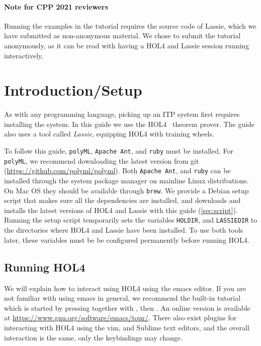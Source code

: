
\paragraph{Note for CPP 2021 reviewers}
Running the examples in the tutorial requires the source code of Lassie, which
we have submitted as non-anonymous material. We chose to submit the tutorial
anonymously, as it can be read with having a HOL4 and Lassie session running
interactively.

\section{Introduction/Setup}
%
As with any programming language, picking up an ITP system first requires
installing the system.
In this guide we use the HOL4~\cite{HOL4web} theorem prover.
The guide also uses a tool called \emph{Lassie}, equipping HOL4 with training
wheels.

To follow this guide, \texttt{polyML}, \texttt{Apache Ant}, and \texttt{ruby}
must be installed.
For \texttt{polyML}, we recommend downloading the latest version from git
(\url{https://github.com/polyml/polyml}).
Both \texttt{Apache Ant}, and \texttt{ruby} can be installed through the system
package manager on mainline Linux distributions.
On Mac OS they should be available through \texttt{brew}.
We provide a Debian setup script that makes sure all the dependencies are
installed,
and downloads and installs the latest versions of HOL4 and Lassie with this
guide (\autoref{sec:script}).
Running the setup script temporarily sets the variables \texttt{HOLDIR}, and
\texttt{LASSIEDIR} to the directories where HOL4 and Lassie have been installed.
To use both tools later, these variables must be be configured permanently
before running HOL4.

\subsection{Running HOL4}

We will explain how to interact using HOL4 using the emacs editor.
If you are not familiar with using emacs in general, we recommend the
built-in tutorial which is started by pressing  together with
, then . An online version is available at
\url{https://www.gnu.org/software/emacs/tour/}.
There also exist plugins for interacting with HOL4 using the vim, and Sublime
text editors, and the overall interaction is the same, only the keybindings may
change.


